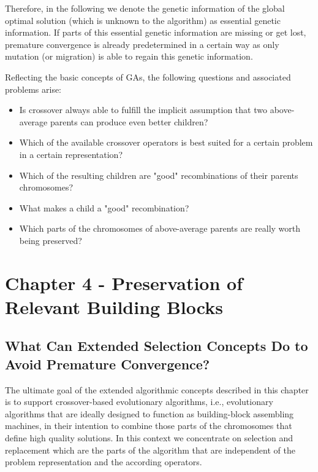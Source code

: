 \documentclass[12pt]{article}
\begin{document}
Therefore, in the following we denote the genetic information of the global optimal solution (which is unknown to the algorithm) as essential genetic information. If parts of this essential genetic information are missing or get lost, premature convergence is already predetermined in a certain way as only mutation (or migration) is able to regain this genetic information.

Reflecting the basic concepts of GAs, the following questions and associated problems arise:
\begin{itemize}
\item Is crossover always able to fulfill the implicit assumption that two above-average parents can produce even better children?
\item Which of the available crossover operators is best suited for a certain problem in a certain representation?
\item Which of the resulting children are "good" recombinations of their parents chromosomes?
\item What makes a child a "good" recombination?
\item Which parts of the chromosomes of above-average parents are really worth being preserved?
\end{itemize}
\clearpage

\section{Chapter 4 - Preservation of Relevant Building Blocks}
\subsection{What Can Extended Selection Concepts Do to Avoid Premature Convergence?}
The ultimate goal of the extended algorithmic concepts described in this chapter is to support crossover-based evolutionary algorithms, i.e., evolutionary algorithms that are ideally designed to function as building-block assembling machines, in their intention to combine those parts of the chromosomes that define high quality solutions. In this context we concentrate on selection and replacement which are the parts of the algorithm that are independent of the problem representation and the according operators.
\end{document}
